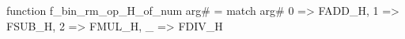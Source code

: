 function f_bin_rm_op_H_of_num arg# = match arg# {
  0 => FADD_H,
  1 => FSUB_H,
  2 => FMUL_H,
  _ => FDIV_H
}
